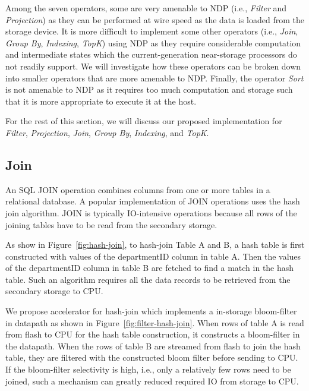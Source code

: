 \documentclass{article}
\newcommand{\filter}{\textit{Filter}\xspace}
\newcommand{\projection}{\textit{Projection}\xspace}
\newcommand{\join}{\textit{Join}\xspace}
\newcommand{\sort}{\textit{Sort}\xspace}
\newcommand{\indexing}{\textit{Indexing}\xspace}
\newcommand{\groupby}{\textit{Group By}\xspace}
\newcommand{\topk}{\textit{TopK}\xspace}
\begin{document}
Among the seven operators, some are very amenable to NDP (i.e., \filter and \projection) as they can be performed at wire speed as the data is loaded from the storage device. It is more difficult to implement some other operators (i.e., \join, \groupby, \indexing, \topk) using NDP as they require considerable computation and intermediate states which the current-generation near-storage processors do not readily support. We will investigate how these operators can be broken down into smaller operators that are more amenable to NDP. 
Finally, the operator \sort is not amenable to NDP as it requires too much computation and storage such that it is more appropriate to execute it at the host. 

For the rest of this section, we will discuss our proposed implementation for \filter, \projection, \join, \groupby, \indexing, and \topk.


\subsection{Join}

An SQL JOIN operation combines columns from one or more tables in a relational database.
A popular implementation of JOIN operations uses the hash join algorithm.
JOIN is typically IO-intensive operations because all rows of the joining tables have to be read from the secondary storage.

As show in Figure~\ref{fig:hash-join}, to hash-join Table A and B, a hash table is first constructed with values of the departmentID column in table A.
Then the values of the departmentID column in table B are fetched to find a match in the hash table.
Such an algorithm requires all the data records to be retrieved from the secondary storage to CPU.

We propose accelerator for hash-join which implements a in-storage bloom-filter in datapath as shown in Figure~\ref{fig:filter-hash-join}.
When rows of table A is read from flash to CPU for the hash table construction, it constructs a bloom-filter in the datapath.
When the rows of table B are streamed from flash to join the hash table, they are filtered with the constructed bloom filter before sending to CPU.
If the bloom-filter selectivity is high, i.e., only a relatively few rows need to be joined, such a mechanism can greatly reduced required IO from storage to CPU.
\end{document}
